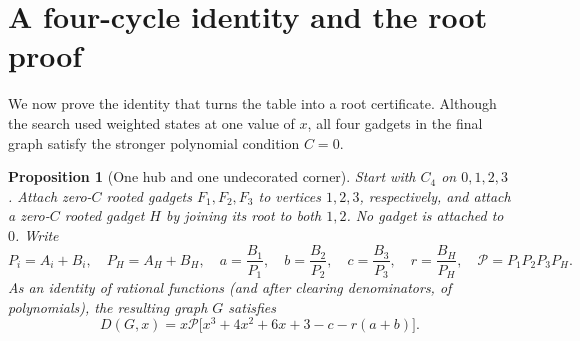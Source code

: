 \documentclass[11pt]{article}
\numberwithin{equation}{section}
\newtheorem{proposition}[theorem]{Proposition}
\theoremstyle{definition}
\newcommand{\D}{D}
\begin{document}
\section{A four-cycle identity and the root proof}\label{sec:identity}

We now prove the identity that turns the table into a root certificate.
Although the search used weighted states at one value of \(x\), all four
gadgets in the final graph satisfy the stronger polynomial condition
\(C=0\).

\begin{proposition}[One hub and one undecorated corner]\label{prop:cycle}
Start with \(C_4\) on \(0,1,2,3\). Attach zero-\(C\) rooted gadgets
\(F_1,F_2,F_3\) to vertices \(1,2,3\), respectively, and attach a
zero-\(C\) rooted gadget \(H\) by joining its root to both \(1,2\).
No gadget is attached to \(0\). Write
\[
 P_i=A_i+B_i,\quad P_H=A_H+B_H,\quad
 a=\frac{B_1}{P_1},\quad b=\frac{B_2}{P_2},\quad
 c=\frac{B_3}{P_3},\quad r=\frac{B_H}{P_H},\quad
 \mathcal P=P_1P_2P_3P_H.
\]
As an identity of rational functions (and after clearing denominators,
of polynomials), the resulting graph \(G\) satisfies
\begin{equation}\label{eq:cycle}
 \D(G,x)=x\mathcal P\bigl[x^3+4x^2+6x+3-c-r(a+b)\bigr].
\end{equation}
\end{proposition}
\end{document}
